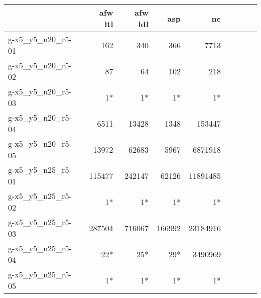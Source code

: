 \begin{tabular}{|l|r|r|r|r|r|r|r|r|}
    \hline
    {} &  \textbf{afw ltl}&    \textbf{afw ldl} &    \textbf{asp} &    \textbf{nc}  \\
    \hline
    g-x5\_y5\_n20\_r5-01 &                        162 &                            340 &                        366 &                      7713 \\
    g-x5\_y5\_n20\_r5-02 &                         87 &                             64 &                        102 &                       218 \\
    g-x5\_y5\_n20\_r5-03 &                          1* &                              1* &                          1* &                         1* \\
    g-x5\_y5\_n20\_r5-04 &                       6511 &                          13428 &                       1348 &                    153447 \\
    g-x5\_y5\_n20\_r5-05 &                      13972 &                          62683 &                       5967 &                   6871918 \\
    \hline
    \hline
    g-x5\_y5\_n25\_r5-01 &                     115477 &                         242147 &                      62126 &                  11891485 \\
    g-x5\_y5\_n25\_r5-02 &                          1* &                              1* &                          1* &                         1* \\
    g-x5\_y5\_n25\_r5-03 &                     287504 &                         716067 &                     166992 &                  23184916 \\
    g-x5\_y5\_n25\_r5-04 &                         22* &                             25* &                         29* &                   3490969 \\
    g-x5\_y5\_n25\_r5-05 &                          1* &                              1* &                          1* &                         1* \\
    \bottomrule
    \end{tabular}
    